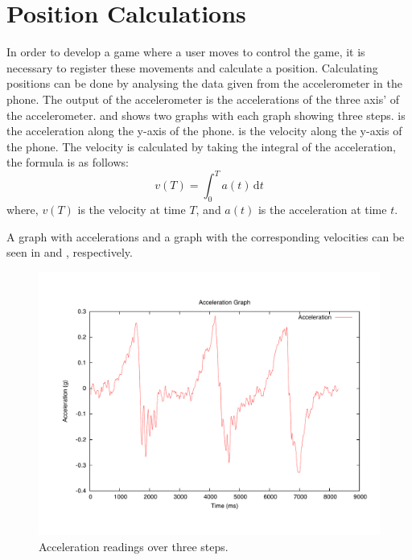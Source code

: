 \section{Position Calculations}\label{sec:position-calculations}
In order to develop a game where a user moves to control the game, it is necessary to register these movements and calculate a position. 
Calculating positions can be done by analysing the data given from the accelerometer in the phone.
The output of the accelerometer is the accelerations of the three axis' of the accelerometer.
 and  shows two graphs with each graph showing three steps.
 is the acceleration along the y-axis of the phone. 
 is the velocity along the y-axis of the phone.
The velocity is calculated by taking the integral of the acceleration, the formula is as follows:
\begin{equation*}
v(T) = \int_0^T \! a(t) \, \mathrm{d}t
\end{equation*} 
where, $v(T)$ is the velocity at time $T$, and $a(t)$ is the acceleration at time $t$.

A graph with accelerations and a graph with the corresponding velocities can be seen in  and , respectively.

\begin{figure}[H]
	\centering	
	\includegraphics[scale=0.4, trim=0cm 2cm 0cm 2cm]{media/gnuplot/acceleration.pdf}
	\caption{Acceleration readings over three steps.}
	\label{figure:acceleration-chart}
\end{figure}

